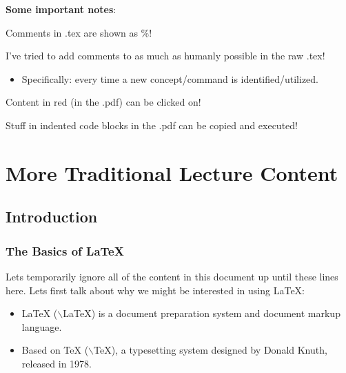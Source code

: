 \documentclass[a4paper, 12pt]{article}
\begin{document}
\textbf{Some important notes}:
\begin{itemize}
{\setlength\itemindent{25pt} 
\item Comments in .tex are shown as \color{red}\%\color{black}!
\item I've tried to add comments to as much as humanly possible in the raw .tex!
\begin{itemize}								%
\item Specifically: every time a new concept/command is identified/utilized.
\end{itemize}
\item Content in \color{red}red \color{black} (in the .pdf) can be clicked on!
\item Stuff in indented code blocks in the .pdf can be copied and executed!
}
\end{itemize}
\newpage 									%

\tableofcontents 								%

\newpage 									%

\section{More Traditional Lecture Content}		%
\subsection{Introduction}						%
\subsubsection{The Basics of \LaTeX{}}			%
Lets temporarily ignore all of the content in this document up until these lines here. Lets first talk about why we might be interested in using \LaTeX{}:

\begin{itemize}								%
\item \LaTeX{}  ($\backslash$LaTeX) is a document preparation system and document markup language.
\item Based on \TeX{} ($\backslash$TeX), a typesetting system designed by Donald Knuth, released in 1978.
\end{itemize}
\end{document}
